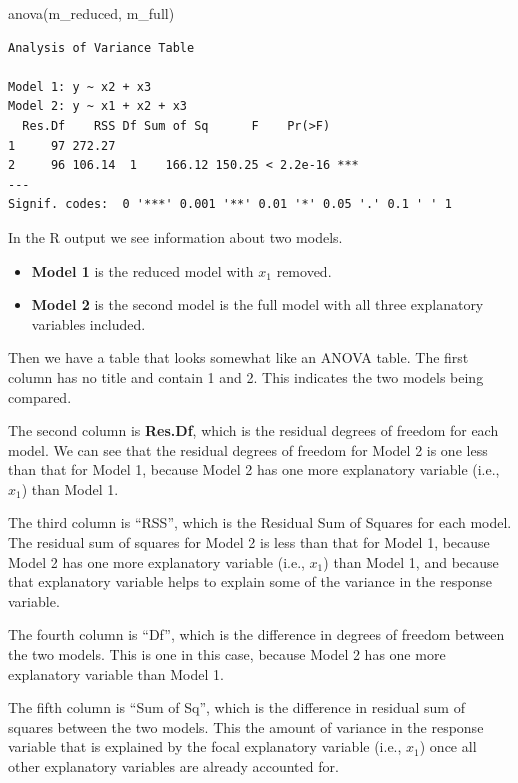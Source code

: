 \documentclass[
  letterpaper,
  8pt,
  a4paper]{book}
\newenvironment{Shaded}{\begin{snugshade}}{\end{snugshade}}
\newcommand{\FunctionTok}[1]{\textcolor[rgb]{0.28,0.35,0.67}{#1}}
\newcommand{\NormalTok}[1]{\textcolor[rgb]{0.00,0.23,0.31}{#1}}
\providecommand{\tightlist}{%
  \setlength{\itemsep}{0pt}\setlength{\parskip}{0pt}}
\begin{document}
\begin{Shaded}
\begin{Highlighting}[]
\FunctionTok{anova}\NormalTok{(m\_reduced, m\_full)}
\end{Highlighting}
\end{Shaded}

\begin{verbatim}
Analysis of Variance Table

Model 1: y ~ x2 + x3
Model 2: y ~ x1 + x2 + x3
  Res.Df    RSS Df Sum of Sq      F    Pr(>F)    
1     97 272.27                                  
2     96 106.14  1    166.12 150.25 < 2.2e-16 ***
---
Signif. codes:  0 '***' 0.001 '**' 0.01 '*' 0.05 '.' 0.1 ' ' 1
\end{verbatim}

In the R output we see information about two models.

\begin{itemize}
\tightlist
\item
  \textbf{Model 1} is the reduced model with \(x_1\) removed.
\item
  \textbf{Model 2} is the second model is the full model with all three
  explanatory variables included.
\end{itemize}

Then we have a table that looks somewhat like an ANOVA table. The first
column has no title and contain 1 and 2. This indicates the two models
being compared.

The second column is \textbf{Res.Df}, which is the residual degrees of
freedom for each model. We can see that the residual degrees of freedom
for Model 2 is one less than that for Model 1, because Model 2 has one
more explanatory variable (i.e., \(x_1\)) than Model 1.

The third column is ``RSS'', which is the Residual Sum of Squares for
each model. The residual sum of squares for Model 2 is less than that
for Model 1, because Model 2 has one more explanatory variable (i.e.,
\(x_1\)) than Model 1, and because that explanatory variable helps to
explain some of the variance in the response variable.

The fourth column is ``Df'', which is the difference in degrees of
freedom between the two models. This is one in this case, because Model
2 has one more explanatory variable than Model 1.

The fifth column is ``Sum of Sq'', which is the difference in residual
sum of squares between the two models. This the amount of variance in
the response variable that is explained by the focal explanatory
variable (i.e., \(x_1\)) once all other explanatory variables are
already accounted for.
\end{document}
